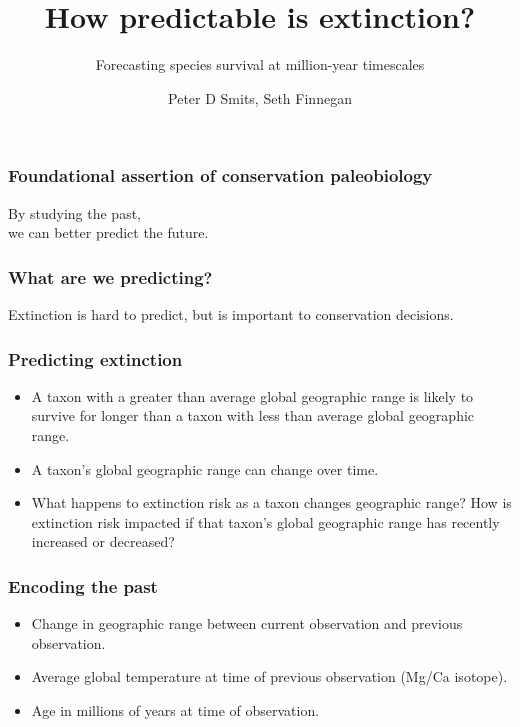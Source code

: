 \documentclass{beamer}
\title{How predictable is extinction?}
\subtitle{Forecasting species survival at million-year timescales}
\author{Peter D Smits, Seth Finnegan}
\institute{Department of Integrative Biology, University of California -- Berkeley}
\date{}
\begin{document}
\begin{frame}
  \maketitle
\end{frame}


\begin{frame}
  \frametitle{Foundational assertion of conservation paleobiology }

  \begin{center}
    \begin{LARGE}
      By studying the \alert{past}, \\we can better predict the \alert{future}.
    \end{LARGE}
  \end{center}

\end{frame}


\begin{frame}
  \frametitle{What are we predicting?}
  
  \begin{center}
    \begin{LARGE}
      Extinction is \alert{hard} to predict, but is \alert{important} to conservation decisions.
    \end{LARGE}
  \end{center}

\end{frame}


\begin{frame}
  \frametitle{Predicting extinction}

  \begin{itemize}[<+->]
    \item A taxon with a \alert{greater than average} global geographic range is likely to survive for longer than a taxon with \alert{less than average} global geographic range.
    \item A taxon's global geographic range can change over time.
    \item What happens to extinction risk as a taxon changes geographic range? How is extinction risk impacted if that taxon's global geographic range has recently \alert{increased} or \alert{decreased}?
  \end{itemize}

\end{frame}


\begin{frame}
  \frametitle{Encoding the past}

  \begin{itemize}
    \item Change in geographic range between current observation and previous observation.
    \item Average global temperature at time of previous observation (Mg/Ca isotope).
    \item Age in millions of years at time of observation.
  \end{itemize}

\end{frame}
\end{document}
